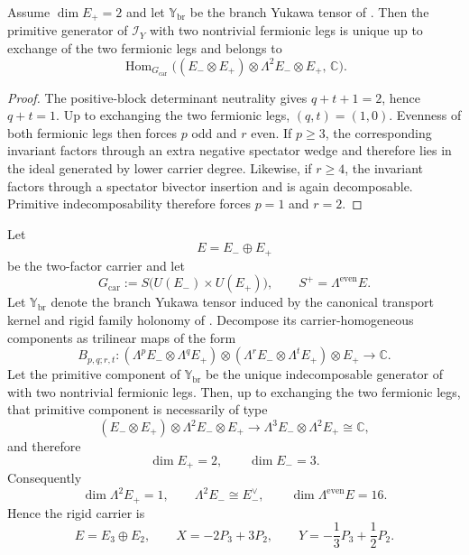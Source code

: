 \begin{lemma}
\label{lem:lowest-primitive-yukawa-generator}
Assume $\dim E_+=2$ and let $\mathbb Y_{\mathrm{br}}$ be the branch Yukawa tensor of
. Then the primitive generator of
$\mathcal I_Y$ with two nontrivial fermionic legs is unique up to exchange of the two fermionic
legs and belongs to
\[
\operatorname{Hom}_{G_{\mathrm{car}}}
\bigl((E_-\otimes E_+)\otimes \Lambda^2 E_-\otimes E_+,\,\mathbb C\bigr).
\]
\end{lemma}

\begin{proof}
The positive-block determinant neutrality gives $q+t+1=2$, hence $q+t=1$. Up to exchanging the two
fermionic legs, $(q,t)=(1,0)$. Evenness of both fermionic legs then forces $p$ odd and $r$ even.
If $p\ge 3$, the corresponding invariant factors through an extra negative spectator wedge and
therefore lies in the ideal generated by lower carrier degree. Likewise, if $r\ge 4$, the
invariant factors through a spectator bivector insertion and is again decomposable. Primitive
indecomposability therefore forces $p=1$ and $r=2$.
\end{proof}

\begin{theorem}
\label{thm:yukawa-forces-32}
Let
\[
E=E_-\oplus E_+
\]
be the two-factor carrier and let
\[
G_{\mathrm{car}}:=S\bigl(U(E_-)\times U(E_+)\bigr),
\qquad
S^+=\Lambda^{\mathrm{even}}E.
\]
Let $\mathbb Y_{\mathrm{br}}$ denote the branch Yukawa tensor induced by the canonical transport
kernel and rigid family holonomy of
. Decompose its carrier-homogeneous
components as trilinear maps of the form
\[
B_{p,q;r,t}:
(\Lambda^p E_-\otimes \Lambda^q E_+)
\otimes
(\Lambda^r E_-\otimes \Lambda^t E_+)
\otimes E_+
\longrightarrow
\mathbb C.
\]
Let the primitive component of $\mathbb Y_{\mathrm{br}}$ be the unique indecomposable generator of
 with two nontrivial
fermionic legs. Then, up to exchanging the two fermionic legs, that primitive component is
necessarily of type
\[
(E_-\otimes E_+) \otimes \Lambda^2 E_- \otimes E_+
\longrightarrow
\Lambda^3 E_-\otimes \Lambda^2 E_+\cong\mathbb C,
\]
and therefore
\[
\dim E_+=2,
\qquad
\dim E_-=3.
\]
Consequently
\[
\dim \Lambda^2 E_+=1,
\qquad
\Lambda^2 E_- \cong E_-^\vee,
\qquad
\dim \Lambda^{\mathrm{even}}E=16.
\]
Hence the rigid carrier is
\[
E=E_3\oplus E_2,
\qquad
X=-2P_3+3P_2,
\qquad
Y=-\frac13 P_3+\frac12 P_2.
\]
\end{theorem}

